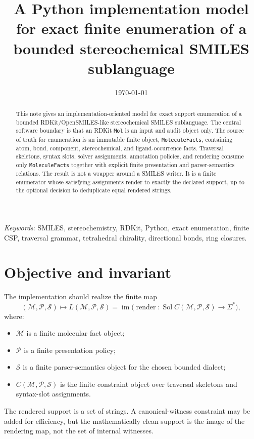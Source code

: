 \documentclass[10pt,a4paper]{article}
\title{A Python implementation model for exact finite enumeration of a bounded stereochemical SMILES sublanguage}
\author{}
\date{\today}
\newcommand{\calM}{\mathcal M}
\newcommand{\calP}{\mathcal P}
\newcommand{\calS}{\mathcal S}
\newcommand{\Sol}{\operatorname{Sol}}
\newcommand{\render}{\operatorname{render}}
\newcommand{\im}{\operatorname{im}}
\theoremstyle{definition}
\theoremstyle{remark}
\begin{document}
\maketitle

\begin{abstract}
This note gives an implementation-oriented model for exact support enumeration
of a bounded RDKit/OpenSMILES-like stereochemical SMILES sublanguage.  The
central software boundary is that an RDKit \texttt{Mol} is an input and audit
object only.  The source of truth for enumeration is an immutable finite object,
\texttt{MoleculeFacts}, containing atom, bond, component, stereochemical, and
ligand-occurrence facts.  Traversal skeletons, syntax slots, solver assignments,
annotation policies, and rendering consume only \texttt{MoleculeFacts} together
with explicit finite presentation and parser-semantics relations.  The result is
not a wrapper around a SMILES writer.  It is a finite enumerator whose satisfying
assignments render to exactly the declared support, up to the optional decision
to deduplicate equal rendered strings.
\end{abstract}

\noindent\textit{Keywords}: SMILES, stereochemistry, RDKit, Python, exact
enumeration, finite CSP, traversal grammar, tetrahedral chirality, directional
bonds, ring closures.

\section{Objective and invariant}
\label{s:objective}

The implementation should realize the finite map
\[
        (\calM,\calP,\calS)
        \longmapsto
        L(\calM,\calP,\calS)
        =
        \im\bigl(\render:\Sol C(\calM,\calP,\calS)\to \Sigma^*\bigr),
\]
where:
\begin{itemize}[leftmargin=*]
\item \(\calM\) is a finite molecular fact object;
\item \(\calP\) is a finite presentation policy;
\item \(\calS\) is a finite parser-semantics object for the chosen bounded
      dialect;
\item \(C(\calM,\calP,\calS)\) is the finite constraint object over traversal
      skeletons and syntax-slot assignments.
\end{itemize}

The rendered support is a set of strings.  A canonical-witness constraint may be
added for efficiency, but the mathematically clean support is the image of the
rendering map, not the set of internal witnesses.
\end{document}
